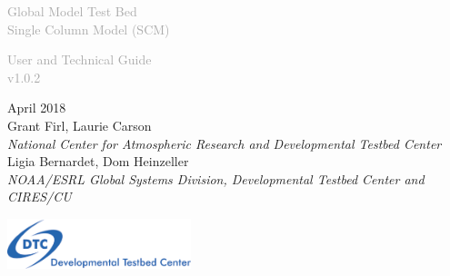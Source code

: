 \begin{titlepage}
\renewcommand{\thefootnote}{\fnsymbol{footnote}}

\vspace*{1em}
\noindent

\begin{center}
\textcolor{darkgray}{\bigsf Global Model Test Bed\\[0.5ex] Single Column Model (SCM)}
\vspace*{1em}\par

\textcolor{darkgray}{\bigst User and Technical Guide\\[0.5ex] v1.0.2}
\vspace*{1em}\par

\large{April 2018}\\[4em]

Grant Firl, Laurie Carson\\
\textit{\small{National Center for Atmospheric Research and Developmental Testbed Center}}\\[4em]

Ligia Bernardet, Dom Heinzeller\\
\textit{\small{NOAA/ESRL Global Systems Division, Developmental Testbed Center and CIRES/CU}}\\[4em]

\vspace{4em}

\includegraphics[width=0.4\textwidth]{images/dtc_logo.png}\\[2em]

\end{center}
\end{titlepage}
\pagebreak{}
